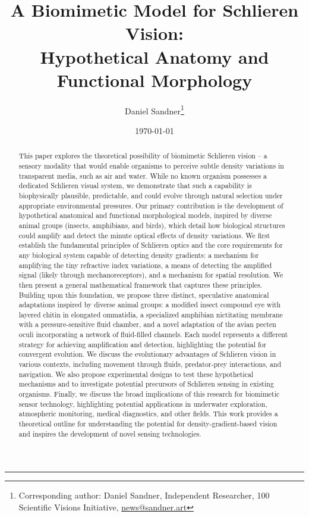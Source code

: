 \documentclass[11pt]{article}
\title{A Biomimetic Model for Schlieren Vision:\\Hypothetical Anatomy and Functional Morphology}
\author{{Daniel Sandner}\thanks{Corresponding author: Daniel Sandner, Independent Researcher, 100 Scientific Visions Initiative, \href{news@sandner.art}{news@sandner.art}}} %
\date{\today} %
\begin{document}
\maketitle

\bigskip\noindent\rule{\linewidth}{0.4pt}\bigskip

\begin{abstract}
This paper explores the theoretical possibility of biomimetic Schlieren vision – a sensory modality that would enable organisms to perceive subtle density variations in transparent media, such as air and water. While no known organism possesses a dedicated Schlieren visual system, we demonstrate that such a capability is biophysically plausible, predictable, and could evolve through natural selection under appropriate environmental pressures. Our primary contribution is the development of hypothetical anatomical and functional morphological models, inspired by diverse animal groups (insects, amphibians, and birds), which detail how biological structures could amplify and detect the minute optical effects of density variations. We first establish the fundamental principles of Schlieren optics and the core requirements for any biological system capable of detecting density gradients: a mechanism for amplifying the tiny refractive index variations, a means of detecting the amplified signal (likely through mechanoreceptors), and a mechanism for spatial resolution. We then present a general mathematical framework that captures these principles. Building upon this foundation, we propose three distinct, speculative anatomical adaptations inspired by diverse animal groups: a modified insect compound eye with layered chitin in elongated ommatidia, a specialized amphibian nictitating membrane with a pressure-sensitive fluid chamber, and a novel adaptation of the avian pecten oculi incorporating a network of fluid-filled channels. Each model represents a different strategy for achieving amplification and detection, highlighting the potential for convergent evolution. We discuss the evolutionary advantages of Schlieren vision in various contexts, including movement through fluids, predator-prey interactions, and navigation. We also propose experimental designs to test these hypothetical mechanisms and to investigate potential precursors of Schlieren sensing in existing organisms. Finally, we discuss the broad implications of this research for biomimetic sensor technology, highlighting potential applications in underwater exploration, atmospheric monitoring, medical diagnostics, and other fields. This work provides a theoretical outline for understanding the potential for density-gradient-based vision and inspires the development of novel sensing technologies.
\end{abstract}
\end{document}
